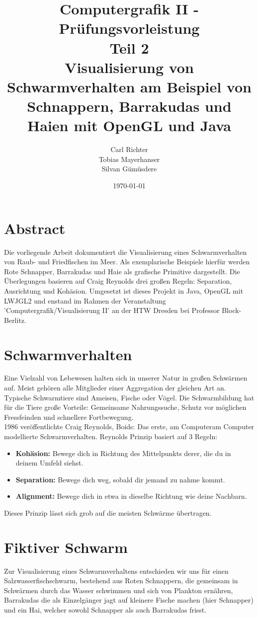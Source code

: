 \documentclass[11pt]{article}
\title{\textbf{Computergrafik II - Prüfungsvorleistung}\\Teil 2\\Visualisierung von Schwarmverhalten am Beispiel von Schnappern, Barrakudas und Haien mit OpenGL und Java}
\date{\today}
\author{Carl Richter\\
		Tobias Mayerhanser\\
		Silvan Gümüsdere}
\begin{document}
\maketitle
\newpage
\tableofcontents
\newpage
\section{Abstract}
Die vorliegende Arbeit dokumentiert die Visualisierung eines Schwarmverhalten von Raub- und Friedfischen im Meer. Als exemplarische Beispiele hierfür werden Rote Schnapper, Barrakudas und Haie als grafische Primitive dargestellt. Die Überlegungen basieren auf Craig Reynolds drei großen Regeln: Separation, Ausrichtung und Kohäsion. Umgesetzt ist dieses Projekt in Java, OpenGL mit LWJGL2 und enstand im Rahmen der Veranstaltung 'Computergrafik/Visualisierung II' an der HTW Dresden bei Professor Block-Berlitz.
\section{Schwarmverhalten}
Eine Vielzahl von Lebewesen halten sich in unserer Natur in großen Schwärmen auf. Meist gehören alle Mitglieder einer Aggregation der gleichen Art an. Typische Schwarmtiere sind Ameisen, Fische oder Vögel. Die Schwarmbildung hat für die Tiere große Vorteile: Gemeinsame Nahrungssuche, Schutz vor möglichen Fressfeinden und schnellere Fortbewegung.\\
1986 veröffentlichte Craig Reynolds, Boids: Das erste, am Computeram Computer modellierte Schwarmverhalten. Reynolds Prinzip basiert auf 3 Regeln:
\begin{itemize}
	\item \textbf{Kohäsion:} Bewege dich in Richtung des Mittelpunkts derer, die du in deinem Umfeld siehst.
	\item \textbf{Separation:} Bewege dich weg, sobald dir jemand zu nahme kommt.
	\item \textbf{Alignment:} Bewege dich in etwa in dieselbe Richtung wie deine Nachbarn.
\end{itemize}
Dieses Prinzip lässt sich grob auf die meisten Schwärme übertragen.
\section{Fiktiver Schwarm}
Zur Visualisierung eines Schwarmverhaltens entschieden wir uns für einen Salzwasserfischschwarm, bestehend aus Roten Schnappern, die gemeinsam in Schwärmen durch das Wasser schwimmen und sich von Plankton ernähren, Barrakudas die als Einzelgänger jagt auf kleinere Fische machen (hier Schnapper) und ein Hai, welcher sowohl Schnapper als auch Barrakudas frisst.
\end{document}

